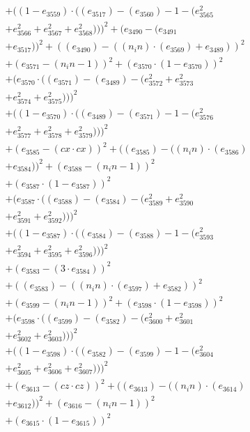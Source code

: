 \documentclass[10pt, a4paper]{article}
\begin{document}
\begin{small}
\begin{align*}
& + ((1 - e_{3559})  \cdot  ((e_{3517}) - (e_{3560}) - 1 - (e_{3565}^{2} \\
& + e_{3566}^{2} + e_{3567}^{2} + e_{3568}^{2})))^{2} + (e_{3490} - (e_{3491} \\
& + e_{3517}))^{2} + ((e_{3490}) - ((n_in)  \cdot  (e_{3569}) + e_{3489}))^{2} \\
& + (e_{3571} - (n_in - 1))^{2} + (e_{3570}  \cdot  (1 - e_{3570}))^{2} \\
& + (e_{3570}  \cdot  ((e_{3571}) - (e_{3489}) - (e_{3572}^{2} + e_{3573}^{2} \\
& + e_{3574}^{2} + e_{3575}^{2})))^{2} \\
& + ((1 - e_{3570})  \cdot  ((e_{3489}) - (e_{3571}) - 1 - (e_{3576}^{2} \\
& + e_{3577}^{2} + e_{3578}^{2} + e_{3579}^{2})))^{2} \\
& + (e_{3585} - (cx  \cdot  cx))^{2} + ((e_{3585}) - ((n_in)  \cdot  (e_{3586}) \\
& + e_{3584}))^{2} + (e_{3588} - (n_in - 1))^{2} \\
& + (e_{3587}  \cdot  (1 - e_{3587}))^{2} \\
& + (e_{3587}  \cdot  ((e_{3588}) - (e_{3584}) - (e_{3589}^{2} + e_{3590}^{2} \\
& + e_{3591}^{2} + e_{3592}^{2})))^{2} \\
& + ((1 - e_{3587})  \cdot  ((e_{3584}) - (e_{3588}) - 1 - (e_{3593}^{2} \\
& + e_{3594}^{2} + e_{3595}^{2} + e_{3596}^{2})))^{2} \\
& + (e_{3583} - (3  \cdot  e_{3584}))^{2} \\
& + ((e_{3583}) - ((n_in)  \cdot  (e_{3597}) + e_{3582}))^{2} \\
& + (e_{3599} - (n_in - 1))^{2} + (e_{3598}  \cdot  (1 - e_{3598}))^{2} \\
& + (e_{3598}  \cdot  ((e_{3599}) - (e_{3582}) - (e_{3600}^{2} + e_{3601}^{2} \\
& + e_{3602}^{2} + e_{3603}^{2})))^{2} \\
& + ((1 - e_{3598})  \cdot  ((e_{3582}) - (e_{3599}) - 1 - (e_{3604}^{2} \\
& + e_{3605}^{2} + e_{3606}^{2} + e_{3607}^{2})))^{2} \\
& + (e_{3613} - (cz  \cdot  cz))^{2} + ((e_{3613}) - ((n_in)  \cdot  (e_{3614}) \\
& + e_{3612}))^{2} + (e_{3616} - (n_in - 1))^{2} \\
& + (e_{3615}  \cdot  (1 - e_{3615}))^{2} \\

\end{align*}
\end{small}
\end{document}
